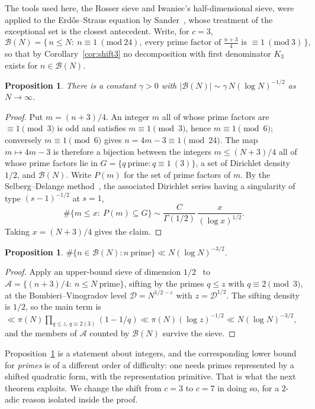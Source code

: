 \documentclass[11pt, a4paper]{article}
\theoremstyle{plain}
\newtheorem{proposition}[theorem]{Proposition}
\theoremstyle{definition}
\begin{document}
The tools used here, the Rosser sieve and Iwaniec's half-dimensional sieve, were applied to the Erd\H{o}s--Straus equation by Sander~\cite{sander1991, sander1994}, whose treatment of the exceptional set is the closest antecedent. Write, for $c=3$,
$$\mathcal{B}(N)=\Big\{\,n\le N:\ n\equiv1\ (\mathrm{mod}\ 24),\ \text{every prime factor of }\tfrac{n+3}{4}\text{ is }\equiv1\ (\mathrm{mod}\ 3)\,\Big\},$$
so that by Corollary~\ref{cor:shift3} no decomposition with first denominator $K_3$ exists for $n\in\mathcal{B}(N)$.

\begin{proposition}\label{prop:blind_lower}
There is a constant $\gamma>0$ with $|\mathcal{B}(N)|\sim \gamma\,N(\log N)^{-1/2}$ as $N\to\infty$.
\end{proposition}
\begin{proof}
Put $m=(n+3)/4$. An integer $m$ all of whose prime factors are $\equiv1\pmod3$ is odd and satisfies $m\equiv1\pmod3$, hence $m\equiv1\pmod6$; conversely $m\equiv1\pmod6$ gives $n=4m-3\equiv1\pmod{24}$. The map $m\mapsto4m-3$ is therefore a bijection between the integers $m\le(N+3)/4$ all of whose prime factors lie in $G=\{q\ \text{prime}:q\equiv1\ (3)\}$, a set of Dirichlet density $1/2$, and $\mathcal{B}(N)$. Write $P(m)$ for the set of prime factors of $m$. By the Selberg--Delange method~\cite[Ch.~II.5]{tenenbaum}, the associated Dirichlet series having a singularity of type $(s-1)^{-1/2}$ at $s=1$,
$$\#\{m\le x:\ P(m)\subseteq G\}\sim \frac{C}{\Gamma(1/2)}\,\frac{x}{(\log x)^{1/2}} .$$
Taking $x=(N+3)/4$ gives the claim.
\end{proof}

\begin{proposition}\label{prop:blind_upper}
$\#\{n\in\mathcal{B}(N):n\ \text{prime}\}\ll N(\log N)^{-3/2}.$
\end{proposition}
\begin{proof}
Apply an upper-bound sieve of dimension $1/2$~\cite{halberstam_richert} to $\mathcal{A}=\{(n+3)/4:\ n\le N\ \text{prime}\}$, sifting by the primes $q\le z$ with $q\equiv2\pmod3$, at the Bombieri--Vinogradov level $\mathcal{D}=N^{1/2-\varepsilon}$ with $z=\mathcal{D}^{1/2}$. The sifting density is $1/2$, so the main term is $\ll\pi(N)\prod_{q\le z,\,q\equiv2(3)}(1-1/q)\ll \pi(N)(\log z)^{-1/2}\ll N(\log N)^{-3/2}$, and the members of $\mathcal{A}$ counted by $\mathcal{B}(N)$ survive the sieve.
\end{proof}

Proposition~\ref{prop:blind_lower} is a statement about integers, and the corresponding lower bound for \emph{primes} is of a different order of difficulty: one needs primes represented by a shifted quadratic form, with the representation primitive. That is what the next theorem exploits. We change the shift from $c=3$ to $c=7$ in doing so, for a $2$-adic reason isolated inside the proof.
\end{document}

